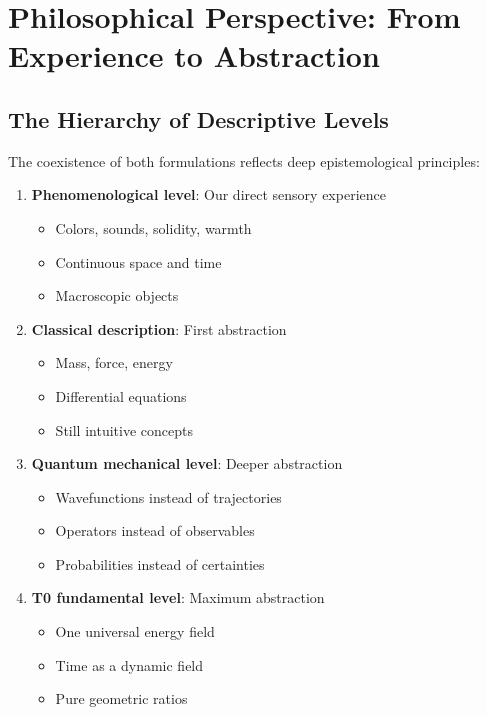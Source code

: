 	\section{Philosophical Perspective: From Experience to Abstraction}
	
	\subsection{The Hierarchy of Descriptive Levels}
	
	The coexistence of both formulations reflects deep epistemological principles:
	
	\begin{tcolorbox}[colback=orange!5!white,colframe=orange!75!black,title=Ontological Stratification of Reality]
		\begin{enumerate}
			\item \textbf{Phenomenological level}: Our direct sensory experience
			\begin{itemize}
				\item Colors, sounds, solidity, warmth
				\item Continuous space and time
				\item Macroscopic objects
			\end{itemize}
			
			\item \textbf{Classical description}: First abstraction
			\begin{itemize}
				\item Mass, force, energy
				\item Differential equations
				\item Still intuitive concepts
			\end{itemize}
			
			\item \textbf{Quantum mechanical level}: Deeper abstraction
			\begin{itemize}
				\item Wavefunctions instead of trajectories
				\item Operators instead of observables
				\item Probabilities instead of certainties
			\end{itemize}
			
			\item \textbf{T0 fundamental level}: Maximum abstraction
			\begin{itemize}
				\item One universal energy field
				\item Time as a dynamic field
				\item Pure geometric ratios
			\end{itemize}
		\end{enumerate}
	\end{tcolorbox}
	
